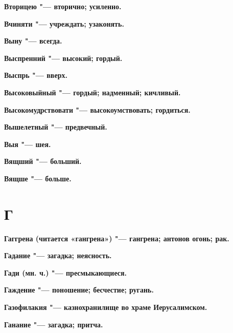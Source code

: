 \begin{mymulticols}{2}
\bfseries Вторицею\normalfont{} "--- вторично; усиленно. 




\bfseries Вчиняти\normalfont{} "--- учреждать; узаконять. 




\bfseries Выну\normalfont{} "--- всегда. 




\bfseries Выспренний\normalfont{} "--- высокий; гордый. 




\bfseries Выспрь\normalfont{} "--- вверх. 




\bfseries Высоковыйный\normalfont{} "--- гордый; надменный; кичливый. 




\bfseries Высокомудрствовати\normalfont{} "--- высокоумствовать; гордиться. 




\bfseries Вышелетный\normalfont{} "--- предвечный. 




\bfseries Выя\normalfont{} "--- шея. 




\bfseries Вящший\normalfont{} "--- больший. 




\bfseries Вящше\normalfont{} "--- больше. 




\section{Г} 





\bfseries Гаггрена\normalfont{} (читается «гангрена») "--- гангрена; антонов огонь; рак. 




\bfseries Гадание\normalfont{} "--- загадка; неясность. 




\bfseries Гади\normalfont{} (мн. ч.) "--- пресмыкающиеся. 




\bfseries Гаждение\normalfont{} "--- поношение; бесчестие; ругань. 




\bfseries Газофилакия\normalfont{} "--- казнохранилище во храме Иерусалимском. 




\bfseries Ганание\normalfont{} "--- загадка; притча. 





\end{mymulticols}
